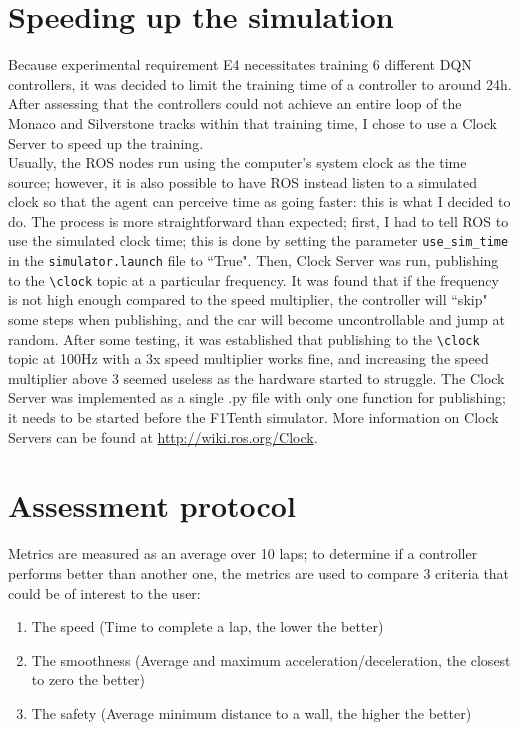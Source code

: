 \section{Speeding up the simulation}
Because experimental requirement E4 necessitates training 6 different DQN controllers, it was decided to limit the training time of a controller to around 24h. After assessing that the controllers could not achieve an entire loop of the Monaco and Silverstone tracks within that training time, I chose to use a Clock Server to speed up the training. \\
Usually, the ROS nodes run using the computer's system clock as the time source; however, it is also possible to have ROS instead listen to a simulated clock so that the agent can perceive time as going faster: this is what I decided to do. The process is more straightforward than expected; first, I had to tell ROS to use the simulated clock time; this is done by setting the parameter \verb|use_sim_time| in the \verb|simulator.launch| file to ``True". Then, Clock Server was run, publishing to the \verb|\clock| topic at a particular frequency. It was found that if the frequency is not high enough compared to the speed multiplier, the controller will ``skip" some steps when publishing, and the car will become uncontrollable and jump at random. After some testing, it was established that publishing to the \verb|\clock| topic at 100Hz with a 3x speed multiplier works fine, and increasing the speed multiplier above 3 seemed useless as the hardware started to struggle. The Clock Server was implemented as a single .py file with only one function for publishing; it needs to be started before the F1Tenth simulator. More information on Clock Servers can be found at \url{http://wiki.ros.org/Clock}.

\section{Assessment protocol}
Metrics are measured as an average over 10 laps; to determine if a controller performs better than another one, the metrics are used to compare 3 criteria that could be of interest to the user: 
\begin{enumerate}
	\item The speed (Time to complete a lap, the lower the better)
	\item The smoothness (Average and maximum acceleration/deceleration, the closest to zero the better)
	\item The safety (Average minimum distance to a wall, the higher the better)
\end{enumerate}

